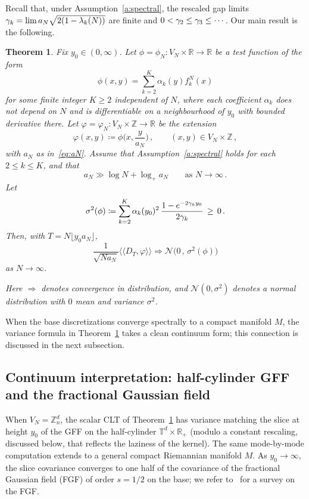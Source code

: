 \documentclass[11pt,a4paper,reqno]{amsart}
\newtheorem{Theorem}{Theorem}[section]
\theoremstyle{definition}
\newcommand{\bbR}{{\ensuremath{\mathbb R}} }
\newcommand{\bbT}{{\ensuremath{\mathbb T}} }
\newcommand{\bbZ}{{\ensuremath{\mathbb Z}} }
\newcommand{\laa}{\langle \! \langle}
\newcommand{\raa}{\rangle \! \rangle}
\begin{document}
Recall that, under Assumption~\ref{a:spectral}, the rescaled gap limits $\gamma_k = \lim a_N\sqrt{2(1-\lambda_k(N))}$ are finite and $0 < \gamma_2 \leq \gamma_3 \leq \cdots$. 
Our main result is the following. 
\begin{Theorem}\label{th:GFF}
Fix $y_0 \in (0, \infty)$. Let $\phi = \phi_N : V_N \times \bbR \to \bbR$ be a test function of the form
	\[ \phi (x,y) = \sum_{k=2}^K \alpha_k(y) f_k^N(x) \]
for some finite integer $K \geq 2$ independent of $N$, where each coefficient $\alpha_k$ does not depend on $N$ and is differentiable on a neighbourhood of $y_0$ with bounded derivative there.
Let $\varphi = \varphi_N : V_N \times \bbZ \to \bbR$ be the extension
	\[ \varphi (x,y) \coloneqq \phi \Big( x , \frac{y}{a_N} \Big)\,, \qquad (x,y) \in V_N \times \bbZ\,, \]
with $a_N$ as in~\eqref{eq:aN}. Assume that Assumption~\ref{a:spectral} holds for each $2 \leq k \leq K$, and that
	\[ a_N \gg \log N + \log_+ a_N \qquad \text{as } N \to \infty\,. \]
Let
	\[ \sigma^2(\phi) \coloneqq \sum_{k=2}^K \alpha_k(y_0)^2 \, \frac{1 - e^{-2\gamma_k y_0}}{2\gamma_k} \,\geq\, 0\,. \]
Then, with $T = N \lfloor y_0 a_N \rfloor$,
	\begin{equation}\label{eq:thGFF}
	 \frac{1}{\sqrt{Na_N}} \laa D_T , \varphi \raa \Rightarrow
	\mathcal{N} \big( 0\,,\, \sigma^2(\phi) \big)
	\end{equation}
as $N\to\infty$. 

Here $\Rightarrow$ denotes convergence in distribution, and $\mathcal{N} (0, \sigma^2)$ denotes a normal distribution with $0$ mean and variance $\sigma^2$.
\end{Theorem}




When the base discretizations converge spectrally to a compact manifold $M$, the variance formula in Theorem~\ref{th:GFF} takes a clean continuum form; this connection is discussed in the next subsection.


\subsection{Continuum interpretation: half-cylinder GFF and the fractional Gaussian field}\label{sec:FGF}

When $V_N = \bbZ_n^d$, the scalar CLT of Theorem~\ref{th:GFF} has variance matching the slice at height $y_0$ of the GFF on the half-cylinder $\bbT^d \times \bbR_+$ (modulo a constant rescaling, discussed below, that reflects the laziness of the kernel). The same mode-by-mode computation extends to a general compact Riemannian manifold $M$. As $y_0 \to \infty$, the slice covariance converges to one half of the covariance of the fractional Gaussian field (FGF) of order $s = 1/2$ on the base; we refer to~\cite{lodhia2014fractional} for a survey on the FGF.
\end{document}
